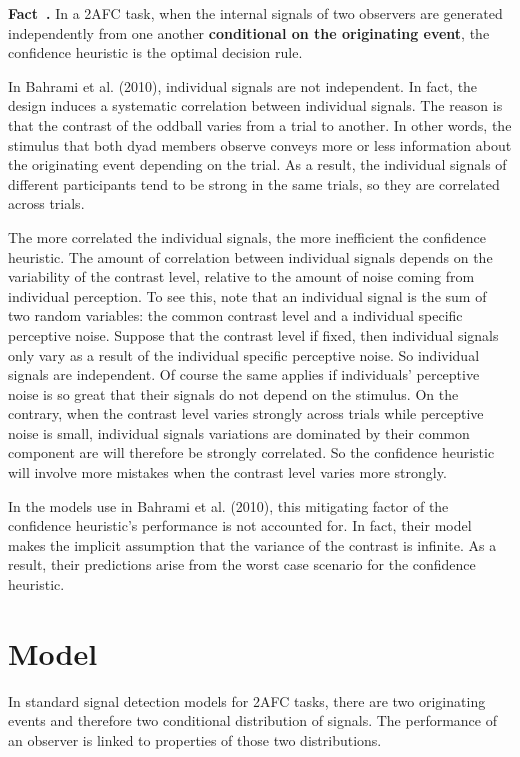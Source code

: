 \documentclass[12pt]{report}
\newcounter{example}[section]
\newenvironment{fact}[1][]{\refstepcounter{example}\par\medskip
   \noindent \textbf{Fact~\theexample. #1} \rmfamily}{\medskip}
\begin{document}
\begin{fact}In a 2AFC task, when the internal signals of two observers are generated independently from one another \textbf{conditional on the originating event}, the confidence heuristic is the optimal decision rule. \end{fact}

In Bahrami et al. (2010), individual signals are not independent. In fact, the design induces a systematic correlation between individual signals. The reason is that the contrast of the oddball varies from a trial to another. In other words, the stimulus that both dyad members observe conveys more or less information about the originating event depending on the trial. As a result, the individual signals of different participants tend to be strong in the same trials, so they are correlated across trials.

The more correlated the individual signals, the more inefficient the confidence heuristic. The amount of correlation between individual signals depends on the variability of the contrast level, relative to the amount of noise coming from individual perception. To see this, note that an individual signal is the sum of two random variables: the common contrast level and a individual specific perceptive noise. Suppose that the contrast level if fixed, then individual signals only vary as a result of the individual specific perceptive noise. So individual signals are independent. Of course the same applies if individuals' perceptive noise is so great that their signals do not depend on the stimulus. On the contrary, when the contrast level varies strongly across trials while perceptive noise is small, individual signals variations are dominated by their common component are will therefore be strongly correlated. So the confidence heuristic will involve more mistakes when the contrast level varies more strongly.

In the models use in Bahrami et al. (2010), this mitigating factor of the confidence heuristic's performance is not accounted for. In fact, their model makes the implicit assumption that the variance of the contrast is infinite. As a result, their predictions arise from the worst case scenario for the confidence heuristic.

\section{Model}

In standard signal detection models for 2AFC tasks, there are two originating events and therefore two conditional distribution of signals. The performance of an observer is linked to properties of those two distributions.
\end{document}
